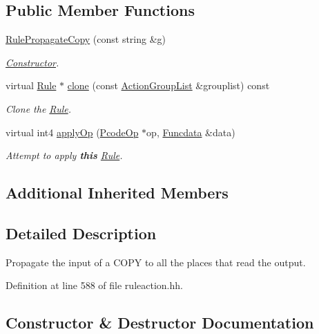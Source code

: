 \subsection*{Public Member Functions}
\begin{DoxyCompactItemize}
\item 
\mbox{\hyperlink{class_rule_propagate_copy_aedaa3ad2a5231ea42abba1b554c37eff}{Rule\+Propagate\+Copy}} (const string \&g)
\begin{DoxyCompactList}\small\item\em \mbox{\hyperlink{class_constructor}{Constructor}}. \end{DoxyCompactList}\item 
virtual \mbox{\hyperlink{class_rule}{Rule}} $\ast$ \mbox{\hyperlink{class_rule_propagate_copy_adcaeff563b266b1410a3a69038a8ba71}{clone}} (const \mbox{\hyperlink{class_action_group_list}{Action\+Group\+List}} \&grouplist) const
\begin{DoxyCompactList}\small\item\em Clone the \mbox{\hyperlink{class_rule}{Rule}}. \end{DoxyCompactList}\item 
virtual int4 \mbox{\hyperlink{class_rule_propagate_copy_a4204e280e01206f9de2f082afffdce81}{apply\+Op}} (\mbox{\hyperlink{class_pcode_op}{Pcode\+Op}} $\ast$op, \mbox{\hyperlink{class_funcdata}{Funcdata}} \&data)
\begin{DoxyCompactList}\small\item\em Attempt to apply {\bfseries{this}} \mbox{\hyperlink{class_rule}{Rule}}. \end{DoxyCompactList}\end{DoxyCompactItemize}
\subsection*{Additional Inherited Members}


\subsection{Detailed Description}
Propagate the input of a C\+O\+PY to all the places that read the output. 

Definition at line 588 of file ruleaction.\+hh.



\subsection{Constructor \& Destructor Documentation}
\mbox{\label{class_rule_propagate_copy_aedaa3ad2a5231ea42abba1b554c37eff}} 
